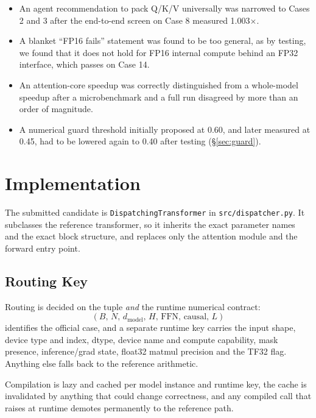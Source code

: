 \documentclass[10pt,conference,compsoc]{IEEEtran}
\begin{document}
\begin{itemize}
    \item An agent recommendation to pack Q/K/V universally was narrowed to Cases 2 and 3 after the end-to-end screen on Case 8 measured 1.003$\times$.
    \item A blanket ``FP16 fails'' statement was found to be too general, as by testing, we found that it does not hold for FP16 internal compute behind an FP32 interface, which passes on Case 14.
    \item An attention-core speedup was correctly distinguished from a whole-model speedup after a microbenchmark and a full run disagreed by more than an order of magnitude.
    \item A numerical guard threshold initially proposed at 0.60, and later measured at 0.45, had to be lowered again to 0.40 after testing (\S\ref{sec:guard}).
\end{itemize}

\section{Implementation}
\label{sec:impl}
The submitted candidate is \texttt{DispatchingTransformer} in \texttt{src/dispatcher.py}. It subclasses the reference transformer, so it inherits the exact parameter names and the exact block structure, and replaces only the attention module and the forward entry point.

\subsection{Routing Key}
Routing is decided on the tuple \emph{and} the runtime numerical contract:
\begin{equation*}
(B,\, N,\, d_\text{model},\, H,\, \text{FFN},\, \text{causal},\, L)
\end{equation*}
identifies the official case, and a separate runtime key carries the input shape, device type and index, dtype, device name and compute capability, mask presence, inference/grad state, float32 matmul precision and the TF32 flag. Anything else falls back to the reference arithmetic.

Compilation is lazy and cached per model instance and runtime key, the cache is invalidated by anything that could change correctness, and any compiled call that raises at runtime demotes permanently to the reference path.
\end{document}
